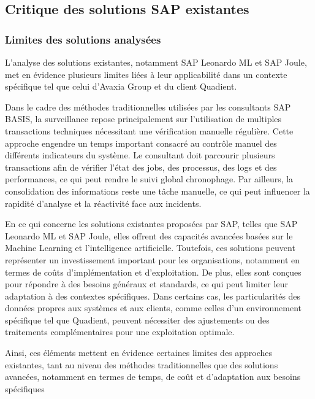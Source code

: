 

\subsection{Critique des solutions SAP existantes}
\label{sec:critique}
\subsubsection{Limites des solutions analysées}

L’analyse des solutions existantes, notamment SAP Leonardo ML et SAP Joule, met en évidence plusieurs limites liées à leur applicabilité dans un contexte spécifique tel que celui d’Avaxia Group et du client Quadient.

Dans le cadre des méthodes traditionnelles utilisées par les consultants SAP BASIS, la surveillance repose principalement sur l’utilisation de multiples transactions techniques nécessitant une vérification manuelle régulière. Cette approche engendre un temps important consacré au contrôle manuel des différents indicateurs du système. Le consultant doit parcourir plusieurs transactions afin de vérifier l’état des jobs, des processus, des logs et des performances, ce qui peut rendre le suivi global chronophage. Par ailleurs, la consolidation des informations reste une tâche manuelle, ce qui peut influencer la rapidité d’analyse et la réactivité face aux incidents.

En ce qui concerne les solutions existantes proposées par SAP, telles que SAP Leonardo ML et SAP Joule, elles offrent des capacités avancées basées sur le Machine Learning et l’intelligence artificielle. Toutefois, ces solutions peuvent représenter un investissement important pour les organisations, notamment en termes de coûts d’implémentation et d’exploitation. De plus, elles sont conçues pour répondre à des besoins généraux et standards, ce qui peut limiter leur adaptation à des contextes spécifiques. Dans certains cas, les particularités des données propres aux systèmes et aux clients, comme celles d’un environnement spécifique tel que Quadient, peuvent nécessiter des ajustements ou des traitements complémentaires pour une exploitation optimale.

Ainsi, ces éléments mettent en évidence certaines limites des approches existantes, tant au niveau des méthodes traditionnelles que des solutions avancées, notamment en termes de temps, de coût et d’adaptation aux besoins spécifiques
\label{sec:solution}
